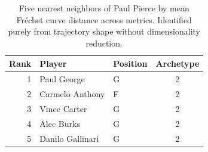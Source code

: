 \begin{table}[htbp]
  \centering\small
  \begin{tabular}{rllc}
    \toprule
    Rank & Player & Position & Archetype \\
    \midrule
    1 & Paul George & G & 2 \\
    2 & Carmelo Anthony & F & 2 \\
    3 & Vince Carter & G & 2 \\
    4 & Alec Burks & G & 2 \\
    5 & Danilo Gallinari & G & 2 \\
    \bottomrule
  \end{tabular}
  \caption{Five nearest neighbors of Paul Pierce by mean Fr\'{e}chet curve distance across metrics. Identified purely from trajectory shape without dimensionality reduction.}
  \label{tab:Paul_Pierce_frechet_curve_neighbors}
\end{table}

